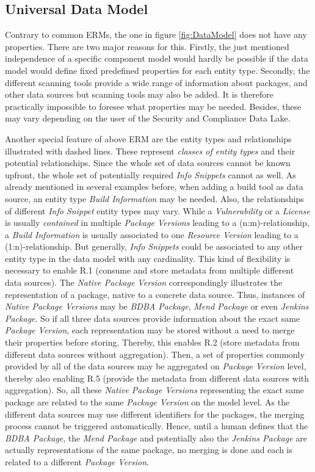 \subsection{Universal Data Model}
Contrary to common ERMs, the one in figure \ref{fig:DataModel} does not have any properties. There are two major reasons for this. Firstly, the just mentioned independence of a specific component model would hardly be possible if the data model would define fixed predefined properties for each entity type. Secondly, the different scanning tools provide a wide range of information about packages, and other data sources but scanning tools may also be added. It is therefore practically impossible to foresee what properties may be needed. Besides, these may vary depending on the user of the Security and Compliance Data Lake.\par
Another special feature of above ERM are the entity types and relationships illustrated with dashed lines. These represent \emph{classes of entity types} and their potential relationships. Since the whole set of data sources cannot be known upfront, the whole set of potentially required \emph{Info Snippets} cannot as well. As already mentioned in several examples before, when adding a build tool as data source, an entity type \emph{Build Information} may be needed. Also, the relationships of different \emph{Info Snippet} entity types may vary. While a \emph{Vulnerability} or a \emph{License} is usually \emph{contained} in multiple \emph{Package Versions} leading to a (n:m)-relationship, a \emph{Build Information} is usually associated to one \emph{Resource Version} leading to a (1:n)-relationship. But generally, \emph{Info Snippets} could be associated to any other entity type in the data model with any cardinality. This kind of flexibility is necessary to enable R.1 (consume and store metadata from multiple different data sources). The \emph{Native Package Version} correspondingly illustrates the representation of a package, native to a concrete data source. Thus, instances of \emph{Native Package Versions} may be \emph{BDBA Package}, \emph{Mend Package} or even \emph{Jenkins Package}. So if all three data sources provide information about the exact same \emph{Package Version}, each representation may be stored without a need to merge their properties before storing. Thereby, this enables R.2 (store metadata from different data sources without aggregation). Then, a set of properties commonly provided by all of the data sources may be aggregated on \emph{Package Version} level, thereby also enabling R.5 (provide the metadata from different data sources with aggregation). So, all these \emph{Native Package Versions} representing the exact same package are related to the same \emph{Package Version} on the model level. As the different data sources may use different identifiers for the packages, the merging process cannot be triggered automatically. Hence, until a human defines that the \emph{BDBA Package}, the \emph{Mend Package} and potentially also the \emph{Jenkins Package} are actually representations of the same package, no merging is done and each is related to a different \emph{Package Version}.\\

